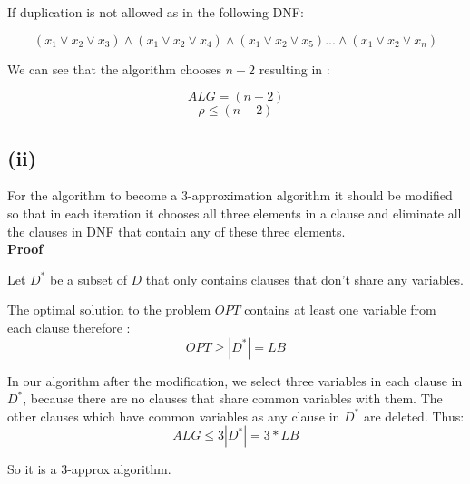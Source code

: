 If duplication is not allowed as in the following DNF:

$$ (x_1 \vee x_2  \vee x_3) \wedge (x_1 \vee x_2 \vee x_4) \wedge (x_1 \vee x_2 \vee x_5) ... \wedge (x_1 \vee x_2 \vee x_n) $$

We can see that the algorithm chooses $ n-2 $ resulting in :

$$ ALG = (n-2) $$ 
$$ \rho \le (n-2)  $$

\subsection*{(ii)}
For the algorithm to become a 3-approximation algorithm it should be modified so that in each iteration it chooses all three elements in a clause and eliminate all the clauses in DNF that contain any of these three elements.\\

\textbf{Proof}

Let $ D^* $ be a subset of $ D $ that only contains clauses that don't share any variables.

The optimal solution to the problem $ OPT $ contains at least one variable from each clause therefore :
$$ OPT \ge |D^*| = LB $$ 

In our algorithm after the modification, we select three variables in each clause in $ D^* $,
because there are no clauses that share common variables with them.
The other clauses which have common variables as any clause in $ D^* $ are deleted.
Thus:
$$ ALG \le 3 |D^*| = 3 * LB $$

So it is a 3-approx algorithm.
